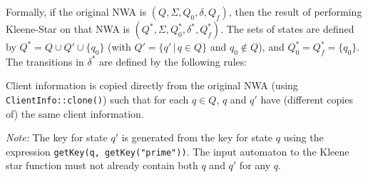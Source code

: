 Formally, if the original NWA is $(Q, \Sigma, Q_0, \delta, Q_f)$,
then the result of performing Kleene-Star on that NWA is $(Q^*, \Sigma,
Q_0^*, \delta^*, Q_f^*)$. The sets of states are defined by $Q^* = Q \cup
Q' \cup \{q_0\}$ (with $Q' = \{q'\, |\, q \in Q\}$ and $q_0 \not \in Q$),
and  $Q_0^* = Q_f^* = \{q_0\}$.
The transitions in $\delta^*$ are defined by the following rules:



Client information is copied directly from the original NWA (using
\texttt{ClientInfo::clone()}) such that for each $q \in Q$, $q$
and $q'$ have (different copies of) the same client information.

\emph{Note:} The key for state $q'$ is generated from the key for state $q$
using the expression \texttt{getKey(q, getKey("prime"))}. The input automaton
to the Kleene star function must not already contain both $q$ and $q'$ for
any $q$.


